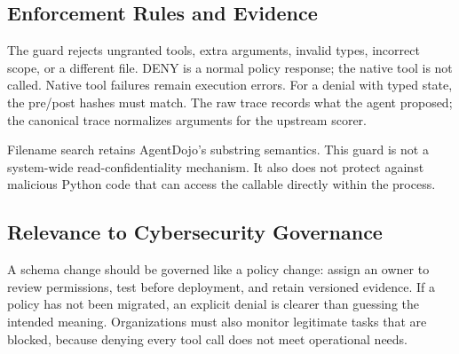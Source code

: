 \subsection{Enforcement Rules and Evidence}
The guard rejects ungranted tools, extra arguments, invalid types, incorrect scope, or a different file. DENY is a normal policy response; the native tool is not called. Native tool failures remain execution errors. For a denial with typed state, the pre/post hashes must match. The raw trace records what the agent proposed; the canonical trace normalizes arguments for the upstream scorer.

Filename search retains AgentDojo's substring semantics. This guard is not a system-wide read-confidentiality mechanism. It also does not protect against malicious Python code that can access the callable directly within the process.

\subsection{Relevance to Cybersecurity Governance}
A schema change should be governed like a policy change: assign an owner to review permissions, test before deployment, and retain versioned evidence. If a policy has not been migrated, an explicit denial is clearer than guessing the intended meaning. Organizations must also monitor legitimate tasks that are blocked, because denying every tool call does not meet operational needs.
